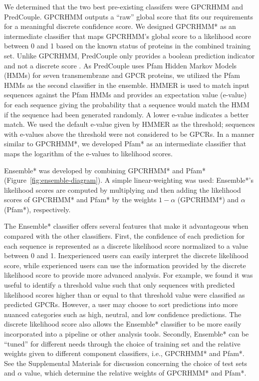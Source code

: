 We determined that the two best pre-existing classifers were GPCRHMM and PredCouple.
GPCRHMM outputs a ``raw'' global score that fits our requirements for a meaningful discrete confidence score.
We designed GPCRHMM* as an intermediate classifier that maps GPCRHMM's global score to a likelihood score between 0 and 1 based on the known status of proteins in the combined training set.
Unlike GPCRHMM, PredCouple only provides a boolean prediction indicator and not a discrete score \cite{Sgourakis2005a, Sgourakis2005}.
As PredCouple uses Pfam Hidden Markov Models (HMMs) for seven transmembrane and GPCR proteins, we utilized the Pfam HMMs as the second classifier in the ensemble.
HMMER \cite{Finn2011} is used to match input sequences against the Pfam HMMs and provides an expectation value (e-value) for each sequence giving the probability that a sequence would match the HMM if the sequence had been generated randomly.
A lower e-value indicates a better match.
We used the default e-value given by HMMER \cite{Finn2011} as the threshold; sequences with e-values above the threshold were not considered to be GPCRs.
In a manner similar to GPCRHMM*, we developed Pfam* as an intermediate classifier that maps the logarithm of the e-values to likelihood scores.

Ensemble* was developed by combining GPCRHMM* and Pfam* (Figure~\ref{fig:ensemble-diagram}).
A simple linear-weighting was used: Ensemble*'s likelihood scores are computed by multiplying and then adding the likelihood scores of GPCRHMM* and Pfam* by the weights $1 - \alpha$ (GPCRHMM*) and $\alpha$ (Pfam*), respectively.

The Ensemble* classifier offers	several	features that make it advantageous when	compared with the other	classifiers. First, the	confidence of each prediction for each sequence is represented as a discrete likelihood score normalized to a value between 0 and 1. Inexperienced users can easily interpret the discrete likelihood score, while experienced users can use the information provided by the discrete likelihood score to provide more advanced analysis. For example, we found	it was useful to identify a threshold value such that only sequences with predicted likelihood scores higher than or equal to that threshold value were classified as predicted GPCRs. However,	a user may choose to sort predictions into more nuanced	categories such	as high, neutral, and low confidence predictions. The discrete likelihood score also allows the	Ensemble* classifier to	be more	easily incorporated into a pipeline or other analysis tools. Secondly, Ensemble* can be	``tuned'' for different needs through the choice of training set and the relative weights given to different component classifiers, i.e., GPCRHMM* and Pfam*. See the Supplemental Materials for discussion concerning the choice of test sets and $\alpha$ value, which determine the relative weights of GPCRHMM* and Pfam*.

